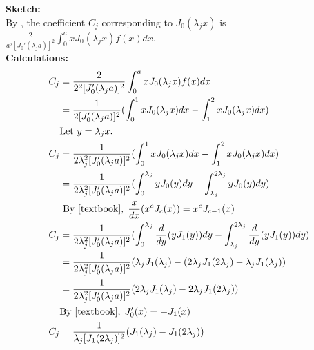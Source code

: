 \documentclass[A4paper,12pt]{article}
\theoremstyle{definition}
\numberwithin{equation}{section}
\begin{document}
\textbf{Sketch:}\\
By \cite{textbook}, the coefficient $C_j$ corresponding to $J_0(\lambda_j x)$ is $\frac{2}{a^2[J_0'(\lambda_ja)]^2} \int_0^a xJ_0(\lambda_jx)f(x)dx$.\\
\textbf{Calculations:}\\
\begin{align*}
    C_j &= \frac{2}{2^2[J_0'(\lambda_ja)]^2} \int_0^a xJ_0(\lambda_jx)f(x)dx
    \\
        &= \frac{1}{2[J_0'(\lambda_ja)]^2}(\int_0^1 xJ_0(\lambda_jx)dx - \int_1^2 xJ_0(\lambda_jx)dx)
        \\
        &\text{Let } y = \lambda_jx. \\
    C_j &= \frac{1}{2\lambda_j^2[J_0'(\lambda_ja)]^2}(\int_0^1 xJ_0(\lambda_jx)dx - \int_1^2 xJ_0(\lambda_jx)dx)
        \\
        &= \frac{1}{2\lambda_j^2[J_0'(\lambda_ja)]^2}(\int_0^{\lambda_j} yJ_0(y)dy - \int_{\lambda_j}^{2\lambda_j} yJ_0(y)dy)
        \\
        &\text{ By }\cite{textbook},\; \frac{x}{dx}(x^cJ_c(x)) = x^cJ_{c-1}(x)\\
    C_j &= \frac{1}{2\lambda_j^2[J_0'(\lambda_ja)]^2}(\int_0^{\lambda_j} \frac{d}{dy}(yJ_1(y))dy - \int_{\lambda_j}^{2\lambda_j} \frac{d}{dy}(yJ_1(y))dy)
        \\
        &= \frac{1}{2\lambda_j^2[J_0'(\lambda_ja)]^2}(\lambda_jJ_1(\lambda_j)-(2\lambda_j J_1(2\lambda_j)-\lambda_jJ_1(\lambda_j))
        \\
        &= \frac{1}{2\lambda_j^2[J_0'(\lambda_ja)]^2}(2\lambda_jJ_1(\lambda_j)-2\lambda_j J_1(2\lambda_j))
        \\
        &\text{By }\cite{textbook},\; J'_0(x) =  -J_1(x)\\
    C_j &= \frac{1}{\lambda_j[J_1(2\lambda_j)]^2}(J_1(\lambda_j)-J_1(2\lambda_j))
\end{align*}



\end{document}
